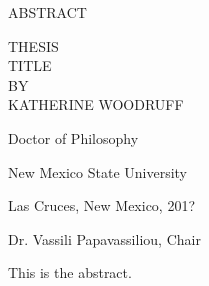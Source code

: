 \begin{center}
ABSTRACT
\end{center}
\vspace{0.3in}
\begin{center}
THESIS\\ TITLE
\\
BY
\\
KATHERINE WOODRUFF
\end{center}
\vspace{0.3in}
\begin{center}
Doctor of Philosophy

New Mexico State University

Las Cruces, New Mexico, 201?

Dr. Vassili Papavassiliou, Chair
\end{center}
\vspace{0.3in}
\hspace{\parindent}
This is the abstract.

\newpage
